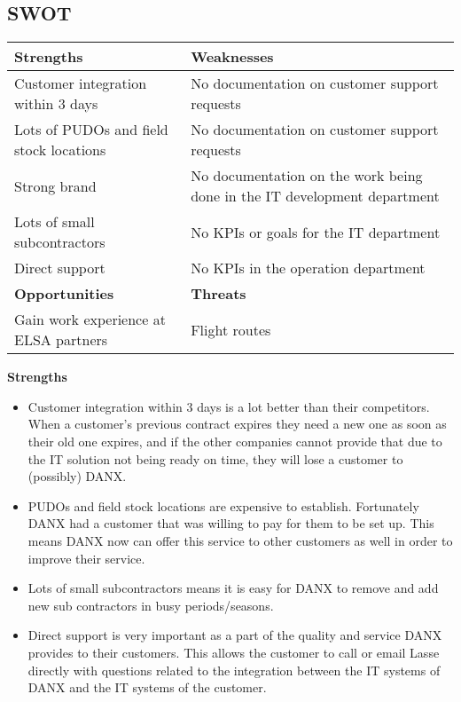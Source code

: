 \subsection{SWOT}

\begin{tabular}{| p{} | p{} |}
\hline
\rowcolor{GR}
\textbf{Strengths} & \textbf{Weaknesses} \\ \hline
Customer integration within 3 days & No documentation on customer support requests \\ \hline
Lots of PUDOs and field stock locations & No documentation on customer support requests \\ \hline
Strong brand & No documentation on the work being done in the IT development department \\ \hline
Lots of small subcontractors & No KPIs or goals for the IT department \\ \hline
Direct support & No KPIs in the operation department \\ \hline \hline
\rowcolor{GR}
\textbf{Opportunities} & \textbf{Threats} \\ \hline
Gain work experience at ELSA partners & Flight routes \\ \hline
\end{tabular}
\qquad

\textbf{Strengths}
\begin{itemize}
\item Customer integration within 3 days is a lot better than their competitors. When a customer’s previous contract expires they need a new one as soon as their old one expires, and if the other companies cannot provide that due to the IT solution not being ready on time, they will lose a customer to (possibly) DANX.
\item PUDOs and field stock locations are expensive to establish. Fortunately DANX had a customer that was willing to pay for them to be set up. This means DANX now can offer this service to other customers as well in order to improve their service.
\item Lots of small subcontractors means it is easy for DANX to remove and add new sub contractors in busy periods/seasons. 
\item Direct support is very important as a part of the quality and service DANX provides to their customers. This allows the customer to call or email Lasse directly with questions related to the integration between the IT systems of DANX and the IT systems of the customer.
\end{itemize}

